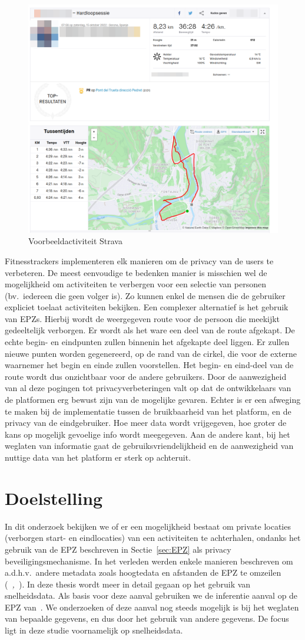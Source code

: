 \begin{figure}
    \centering
    \includegraphics[width=0.5\linewidth]{fig/VoorbeeldActiviteiten/VoorbeeldActiviteit_Cropped.png}
    \caption{Voorbeeldactiviteit Strava}\label{fig:activityExample}
\end{figure}

Fitnesstrackers implementeren elk manieren om de privacy van de users te
verbeteren. De meest eenvoudige te bedenken manier is misschien wel de
mogelijkheid om activiteiten te verbergen voor een selectie van personen (bv.\
iedereen die geen volger is). Zo kunnen enkel de mensen die de gebruiker
expliciet toelaat activiteiten bekijken. Een complexer alternatief is het
gebruik van \acp{EPZ}. Hierbij wordt de weergegeven route voor de persoon die
meekijkt gedeeltelijk verborgen. Er wordt als het ware een deel van de route
afgekapt. De echte begin- en eindpunten zullen binnenin het afgekapte deel
liggen. Er zullen nieuwe punten worden gegenereerd, op de rand van de cirkel,
die voor de externe waarnemer het begin en einde zullen voorstellen. Het begin-
en eind-deel van de route wordt dus onzichtbaar voor de andere gebruikers. Door
de aanwezigheid van al deze pogingen tot privacyverbeteringen valt op dat de
ontwikkelaars van de platformen erg bewust zijn van de mogelijke gevaren.
Echter is er een afweging te maken bij de implementatie tussen de bruikbaarheid
van het platform, en de privacy van de eindgebruiker. Hoe meer data wordt
vrijgegeven, hoe groter de kans op mogelijk gevoelige info wordt meegegeven.
Aan de andere kant, bij het weglaten van informatie gaat de
gebruiksvriendelijkheid en de aanwezigheid van nuttige data van het platform er
sterk op achteruit.

\section{Doelstelling}
In dit onderzoek bekijken we of er een mogelijkheid bestaat om private locaties
(verborgen start- en eindlocaties) van een activiteiten te achterhalen, ondanks
het gebruik van de \ac{EPZ} beschreven in Sectie~\ref{sec:EPZ} als privacy
beveiligingsmechanisme. In het verleden werden enkele manieren beschreven om
a.d.h.v.\ andere metadata zoals hoogtedata en afstanden de \ac{EPZ} te omzeilen
(\textit{~\cite{Dhondt},~\cite{Verdonck_2022}}).
In deze thesis wordt meer in detail gegaan op het gebruik van snelheidsdata.
Als basis voor deze aanval gebruiken we de inferentie aanval op de EPZ
van~\citeauthor{Dhondt}. We
onderzoeken of deze aanval nog steeds mogelijk is bij het weglaten van bepaalde
gegevens, en dus door het gebruik van andere gegevens. De focus ligt in deze
studie voornamelijk op snelheidsdata.


